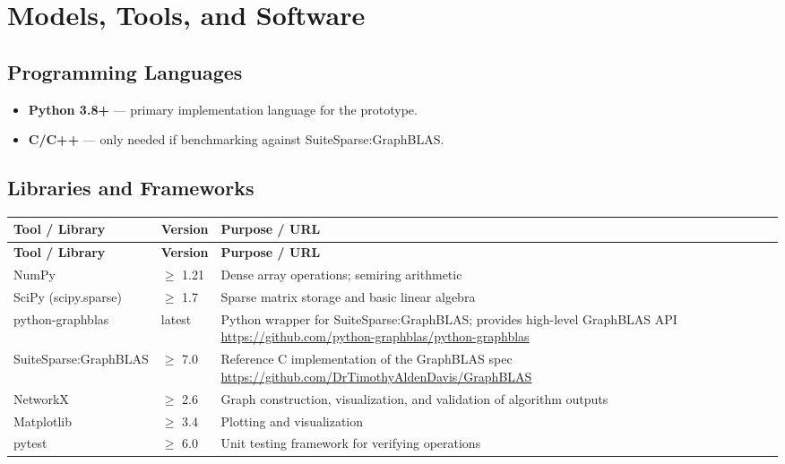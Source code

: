 \documentclass[11pt,a4paper]{article}
\begin{document}
\section{Models, Tools, and Software}

\subsection{Programming Languages}
\begin{itemize}
  \item \textbf{Python 3.8+} --- primary implementation language for the prototype.
  \item \textbf{C/C++} --- only needed if benchmarking against SuiteSparse:GraphBLAS.
\end{itemize}

\subsection{Libraries and Frameworks}
\begin{longtable}{p{4.5cm} p{2.5cm} p{6.5cm}}
\toprule
\textbf{Tool / Library} & \textbf{Version} & \textbf{Purpose / URL} \\
\midrule
\endfirsthead
\toprule
\textbf{Tool / Library} & \textbf{Version} & \textbf{Purpose / URL} \\
\midrule
\endhead
NumPy & $\geq$ 1.21 & Dense array operations; semiring arithmetic \\
\midrule
SciPy (scipy.sparse) & $\geq$ 1.7 & Sparse matrix storage and basic linear algebra \\
\midrule
python-graphblas & latest & Python wrapper for SuiteSparse:GraphBLAS; provides high-level GraphBLAS API \newline \url{https://github.com/python-graphblas/python-graphblas} \\
\midrule
SuiteSparse:GraphBLAS & $\geq$ 7.0 & Reference C implementation of the GraphBLAS spec \newline \url{https://github.com/DrTimothyAldenDavis/GraphBLAS} \\
\midrule
NetworkX & $\geq$ 2.6 & Graph construction, visualization, and validation of algorithm outputs \\
\midrule
Matplotlib & $\geq$ 3.4 & Plotting and visualization \\
\midrule
pytest & $\geq$ 6.0 & Unit testing framework for verifying operations \\
\bottomrule
\end{longtable}
\end{document}
